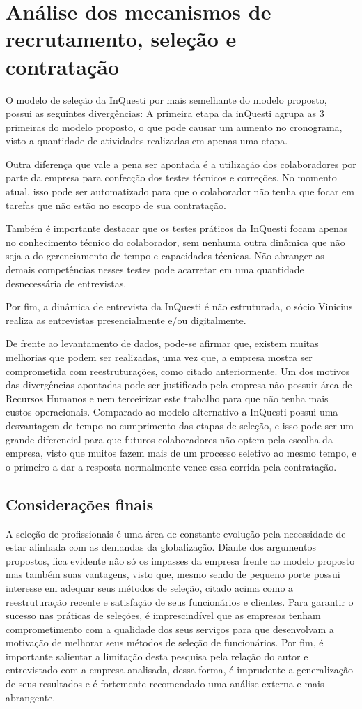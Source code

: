 \chapter{Análise dos mecanismos de recrutamento, seleção e contratação}
O modelo de seleção da InQuesti por mais semelhante do modelo proposto, possui as seguintes divergências:
A primeira etapa da inQuesti agrupa as 3 primeiras do modelo proposto, o que pode causar um aumento no cronograma, visto a quantidade de atividades realizadas em apenas uma etapa.

Outra diferença que vale a pena ser apontada é a utilização dos colaboradores por parte da empresa para confecção dos testes técnicos e correções. No momento atual, isso pode ser automatizado para que o colaborador não tenha que focar em tarefas que não estão no escopo de sua contratação. 

Também é importante destacar que os testes práticos da InQuesti focam apenas no conhecimento técnico do colaborador, sem nenhuma outra dinâmica que não seja a do gerenciamento de tempo e capacidades técnicas. Não abranger as demais competências nesses testes pode acarretar em uma quantidade desnecessária de entrevistas.

Por fim, a dinâmica de entrevista da InQuesti é não estruturada, o sócio Vinicius realiza as entrevistas presencialmente e/ou digitalmente.

De frente ao levantamento de dados, pode-se afirmar que, existem muitas melhorias que podem ser realizadas, uma vez que, a empresa mostra ser comprometida com reestruturações, como citado anteriormente.
Um dos motivos das divergências apontadas pode ser justificado pela empresa não possuir área de Recursos Humanos e nem terceirizar este trabalho para que não tenha mais custos operacionais.
Comparado ao modelo alternativo a InQuesti possui uma desvantagem de tempo no cumprimento das etapas de seleção, e isso pode ser um grande diferencial para que futuros colaboradores não optem pela escolha da empresa, visto que muitos fazem mais de um processo seletivo ao mesmo tempo, e o primeiro a dar a resposta normalmente vence essa corrida pela contratação.

\section{Considerações finais}
A seleção de profissionais é uma área de constante evolução pela necessidade de estar alinhada com as demandas da globalização.
Diante dos argumentos propostos, fica evidente não só os impasses da empresa frente ao modelo proposto mas também suas vantagens, visto que, mesmo sendo de pequeno porte possui interesse em adequar seus métodos de seleção, citado acima como a reestruturação recente e satisfação de seus funcionários e clientes.
Para garantir o sucesso nas práticas de seleções, é imprescindível que as empresas tenham comprometimento com a qualidade dos seus serviços para que desenvolvam a motivação de melhorar seus métodos de seleção de funcionários.
Por fim, é importante salientar a limitação desta pesquisa pela relação do autor e entrevistado com a empresa analisada, dessa forma, é imprudente a generalização de seus resultados e é fortemente recomendado uma análise externa e mais abrangente.
